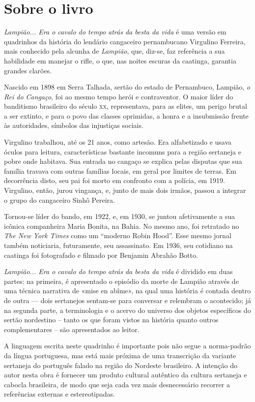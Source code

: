 \documentclass[11pt]{extarticle}
\begin{document}
\section{Sobre o livro}

\textit{Lampião... Era o cavalo do tempo atrás da besta da vida} é uma versão em quadrinhos da 
história do lendário cangaceiro pernambucano Virgulino Ferreira, mais conhecido pela alcunha de \textit{Lampião},
que, diz-se, faz referência a sua habilidade em manejar o rifle,
o que, nas noites escuras da caatinga, garantia grandes clarões.

Nascido em 1898 em Serra Talhada, sertão do estado de Pernambuco, Lampião, \textit{o Rei do Cangaço}, 
foi ao mesmo tempo herói e contraventor. O maior líder do banditismo brasileiro do século \textsc{xx},
representava, para as elites, um perigo brutal a ser extinto, e para o povo das
classes oprimidas, a honra e a insubmissão frente às autoridades, símbolos das injustiças sociais. 

Virgulino trabalhou, até os 21 anos, como artesão. Era alfabetizado e usava óculos para leitura, 
características bastante incomuns para a região sertaneja e pobre onde habitava.
Sua entrada no cangaço se explica pelas disputas que sua família travava com outras famílias locais, 
em geral por limites de terras. Em decorrência disto, seu pai foi morto em confronto com a polícia, em 1919. 
Virgulino, então, jurou vingança, e, junto de mais dois irmãos, passou a integrar o grupo do cangaceiro Sinhô Pereira.

Tornou-se líder do bando, em 1922, e, em 1930, se juntou afetivamente a sua icônica companheira Maria Bonita, 
na Bahia. No mesmo ano, foi retratado no \textit{The New York Times} como um ``moderno Robin Hood''. Esse mesmo jornal também noticiaria, futuramente, seu assassinato. Em 1936, seu cotidiano na caatinga foi fotografado e 
filmado por Benjamin Abrahão Botto. 

\textit{Lampião... Era o cavalo do tempo atrás da besta da vida} é dividido em duas partes: na primeira, é apresentado o episódio da morte de Lampião através 
de uma técnica narrativa de «mise en abîme», na qual uma história é contada dentro de outra --- dois sertanejos sentam-se para conversar e relembram o acontecido; já na segunda parte, a terminologia e o acervo do universo 
dos objetos específicos do sertão nordestino -- tanto os que foram vistos na história quanto outros complementares -- são apresentados ao leitor. 

A linguagem escrita neste quadrinho é importante pois não segue a norma-padrão da língua portuguesa, mas
está mais próxima de uma transcrição da variante sertaneja do português falado na região do Nordeste brasileiro. 
A intenção do autor nesta obra é fornecer um produto cultural autêntico da cultura sertaneja e cabocla
brasileira, de modo que seja cada vez mais desnecessário recorrer a referências externas e estereotipadas. 
\end{document}
